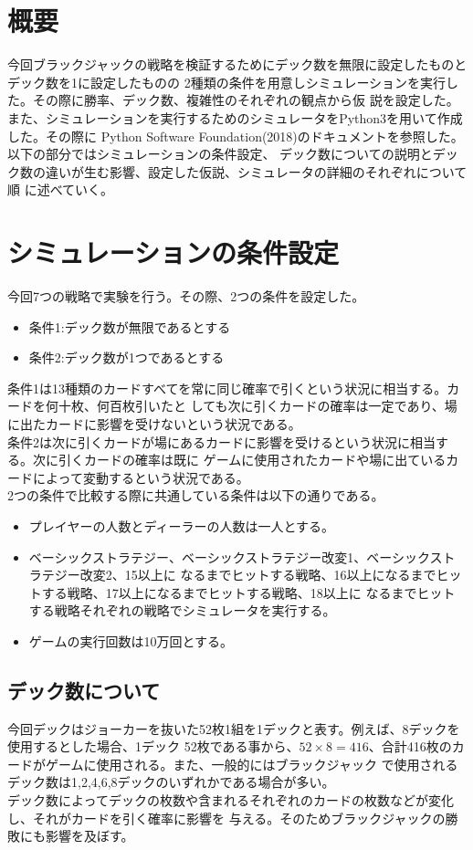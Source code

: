 \section{概要}
今回ブラックジャックの戦略を検証するためにデック数を無限に設定したものとデック数を1に設定したものの
2種類の条件を用意しシミュレーションを実行した。その際に勝率、デック数、複雑性のそれぞれの観点から仮
説を設定した。また、シミュレーションを実行するためのシミュレータをPython3を用いて作成した。その際に
Python Software Foundation(2018)のドキュメントを参照した。以下の部分ではシミュレーションの条件設定、
デック数についての説明とデック数の違いが生む影響、設定した仮説、シミュレータの詳細のそれぞれについて順
に述べていく。

\section{シミュレーションの条件設定}
今回7つの戦略で実験を行う。その際、2つの条件を設定した。
\begin{itemize}
\item 条件1:デック数が無限であるとする
\item 条件2:デック数が1つであるとする
\end{itemize}
条件1は13種類のカードすべてを常に同じ確率で引くという状況に相当する。カードを何十枚、何百枚引いたと
しても次に引くカードの確率は一定であり、場に出たカードに影響を受けないという状況である。\\
条件2は次に引くカードが場にあるカードに影響を受けるという状況に相当する。次に引くカードの確率は既に
ゲームに使用されたカードや場に出ているカードによって変動するという状況である。\\
2つの条件で比較する際に共通している条件は以下の通りである。
\begin{itemize}
\item プレイヤーの人数とディーラーの人数は一人とする。
\item ベーシックストラテジー、ベーシックストラテジー改変1、ベーシックストラテジー改変2、15以上に
なるまでヒットする戦略、16以上になるまでヒットする戦略、17以上になるまでヒットする戦略、18以上に
なるまでヒットする戦略それぞれの戦略でシミュレータを実行する。
\item ゲームの実行回数は10万回とする。
\end{itemize}

\subsection{デック数について}
今回デックはジョーカーを抜いた52枚1組を1デックと表す。例えば、8デックを使用するとした場合、1デック
52枚である事から、$52×8=416$、合計416枚のカードがゲームに使用される。また、一般的にはブラックジャック
で使用されるデック数は1,2,4,6,8デックのいずれかである場合が多い。\\
デック数によってデックの枚数や含まれるそれぞれのカードの枚数などが変化し、それがカードを引く確率に影響を
与える。そのためブラックジャックの勝敗にも影響を及ぼす。


